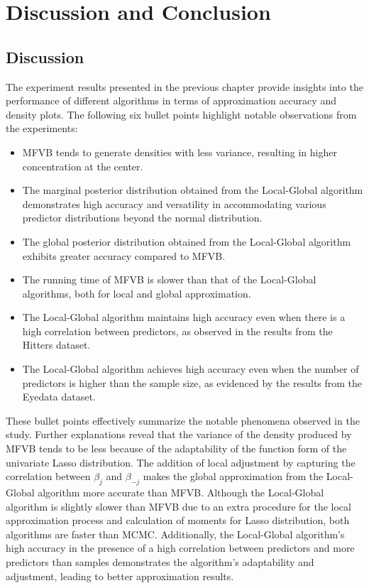 \chapter{Discussion and Conclusion}

\section{Discussion}
The experiment results presented in the previous chapter provide insights into the performance of different algorithms in terms of approximation accuracy and density plots. The following six bullet points highlight notable observations from the experiments:
\begin{itemize}
    \item MFVB tends to generate densities with less variance, resulting in higher concentration at the center.
    \item The marginal posterior distribution obtained from the Local-Global algorithm demonstrates high accuracy and versatility in accommodating various predictor distributions beyond the normal distribution.
    \item The global posterior distribution obtained from the Local-Global algorithm exhibits greater accuracy compared to MFVB.
    \item The running time of MFVB is slower than that of the Local-Global algorithms, both for local and global approximation.
    \item The Local-Global algorithm maintains high accuracy even when there is a high correlation between predictors, as observed in the results from the Hitters dataset.
    \item The Local-Global algorithm achieves high accuracy even when the number of predictors is higher than the sample size, as evidenced by the results from the Eyedata dataset.
\end{itemize}
These bullet points effectively summarize the notable phenomena observed in the study. Further explanations reveal that the variance of the density produced by MFVB tends to be less because of the adaptability of the function form of the univariate Lasso distribution. The addition of local adjustment by capturing the correlation between $\beta_j$ and $\beta_{-j}$ makes the global approximation from the Local-Global algorithm more accurate than MFVB. Although the Local-Global algorithm is slightly slower than MFVB due to an extra procedure for the local approximation process and calculation of moments for Lasso distribution, both algorithms are faster than MCMC. Additionally, the Local-Global algorithm's high accuracy in the presence of a high correlation between predictors and more predictors than samples demonstrates the algorithm's adaptability and adjustment, leading to better approximation results.











